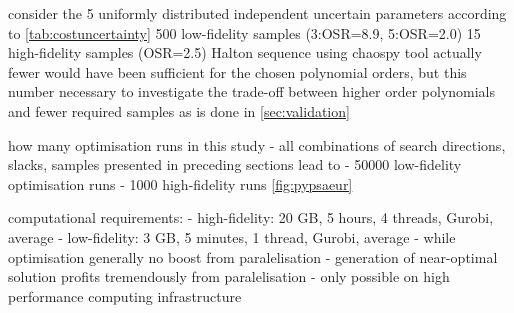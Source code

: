 
consider the 5 uniformly distributed independent uncertain parameters according to \cref{tab:costuncertainty}
500 low-fidelity samples (3:OSR=8.9, 5:OSR=2.0)
15 high-fidelity samples (OSR=2.5)
Halton sequence using chaospy tool \cite{feinberg_chaospy_2015}
actually fewer would have been sufficient for the chosen polynomial orders,
but this number necessary to investigate the trade-off between higher order polynomials and fewer required samples
as is done in \cref{sec:validation}

how many optimisation runs in this study
- all combinations of search directions, slacks, samples presented in preceding sections lead to
- 50000 low-fidelity optimisation runs
- 1000 high-fidelity runs \cref{fig:pypsaeur}

computational requirements:
- high-fidelity: 20 GB, 5 hours, 4 threads, Gurobi, average 
- low-fidelity: 3 GB, 5 minutes, 1 thread, Gurobi, average
- while optimisation generally no boost from paralelisation
- generation of near-optimal solution profits tremendously from paralelisation
- only possible on high performance computing infrastructure

